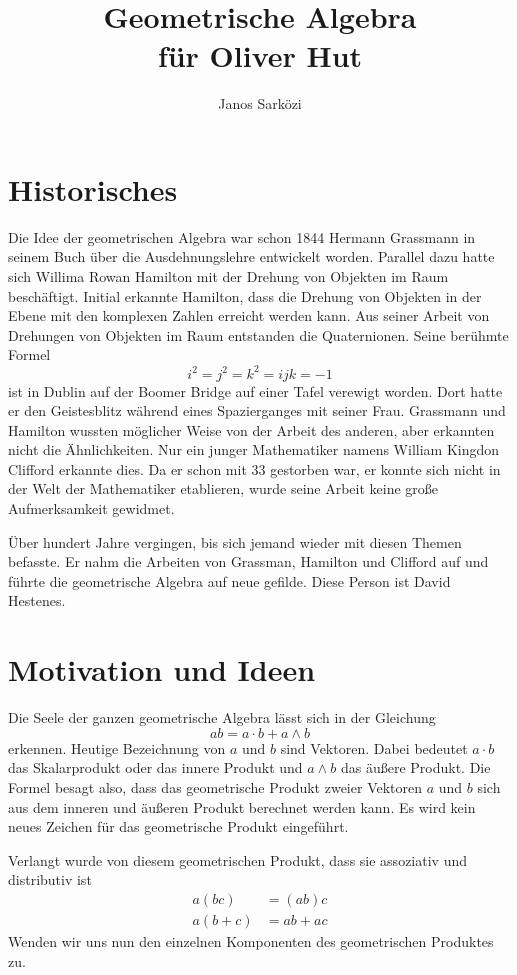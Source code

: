 \documentclass[fleqn]{scrartcl}
\title{Geometrische Algebra \\
für Oliver Hut}
\author{Janos Sarközi}
\numberwithin{equation}{section}
\begin{document}
\maketitle
\newpage
\section{Historisches}
Die Idee der geometrischen Algebra war schon 1844 Hermann Grassmann in seinem
Buch über die Ausdehnungslehre entwickelt worden. Parallel dazu hatte sich
Willima Rowan Hamilton mit der Drehung von Objekten im Raum beschäftigt.
Initial erkannte Hamilton, dass die Drehung von Objekten in der Ebene mit den
komplexen Zahlen erreicht werden kann. Aus seiner Arbeit von Drehungen von
Objekten im Raum entstanden die Quaternionen. Seine berühmte Formel
\[i^2=j^2=k^2=ijk=-1\]
ist in Dublin auf der Boomer Bridge auf einer Tafel verewigt worden. Dort
hatte er den Geistesblitz während eines Spazierganges mit seiner Frau.
Grassmann und Hamilton wussten möglicher Weise von der Arbeit des anderen,
aber erkannten nicht die Ähnlichkeiten. Nur ein junger Mathematiker namens
William Kingdon Clifford erkannte dies. Da er schon mit 33 gestorben war,
er konnte sich nicht in der Welt der Mathematiker etablieren, wurde seine
Arbeit keine große Aufmerksamkeit gewidmet.

Über hundert Jahre vergingen, bis sich jemand wieder mit diesen Themen
befasste. Er nahm die Arbeiten von Grassman, Hamilton und Clifford auf und
führte die geometrische Algebra auf neue gefilde. Diese Person ist David
Hestenes.

\section{Motivation und Ideen}
Die Seele der ganzen geometrische Algebra lässt sich in der
Gleichung
\[ab = a\cdot b + a\wedge b\]
erkennen. Heutige Bezeichnung von $a$ und $b$ sind Vektoren. Dabei bedeutet
$a\cdot b$ das Skalarprodukt oder das innere Produkt und $a\wedge b$ das
äußere Produkt. Die Formel besagt also, dass das geometrische Produkt zweier
Vektoren $a$ und $b$ sich aus dem inneren und äußeren Produkt berechnet
werden kann. Es wird kein neues Zeichen für das geometrische Produkt
eingeführt.

Verlangt wurde von diesem geometrischen Produkt, dass sie assoziativ und 
distributiv ist
\begin{align*}
    a(bc) &= (ab)c \\
    a(b+c) &= ab + ac
\end{align*}
Wenden wir uns nun den einzelnen Komponenten des geometrischen Produktes zu.
\end{document}
